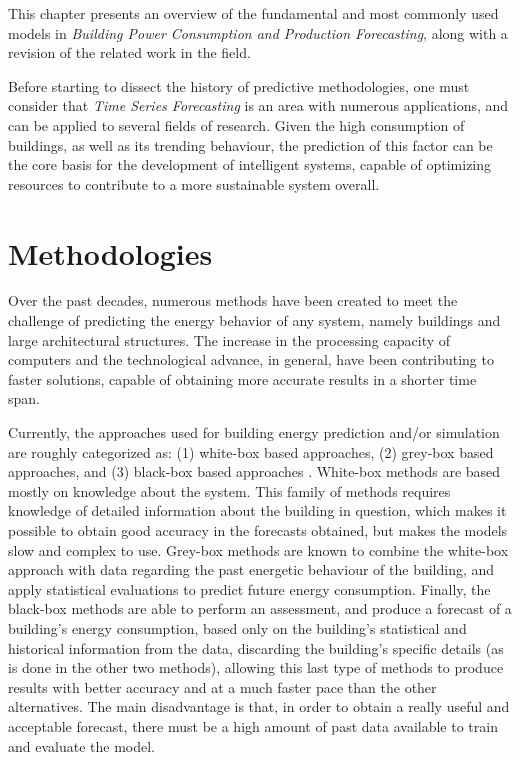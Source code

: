 \cleardoublepage
\label{chap:background}

This chapter presents an overview of the fundamental and most commonly used models in \textit{Building Power Consumption and Production Forecasting}, along with a revision of the related work in the field.

Before starting to dissect the history of predictive methodologies, one must consider that \textit{Time Series Forecasting} is an area with numerous applications, and can be applied to several fields of research. Given the high consumption of buildings, as well as its trending behaviour, the prediction of this factor can be the core basis for the development of intelligent systems, capable of optimizing resources to contribute to a more sustainable system overall.


\section{Methodologies\label{a}}

Over the past decades, numerous methods have been created to meet the challenge of predicting the energy behavior of any system, namely buildings and large architectural structures. The increase in the processing capacity of computers and the technological advance, in general, have been contributing to faster solutions, capable of obtaining more accurate results in a shorter time span.

Currently, the approaches used for building energy prediction and/or simulation are roughly categorized as: (1) white-box based approaches, (2) grey-box based approaches, and (3) black-box based approaches \cite{review2017}. White-box methods are based mostly on knowledge about the system. This family of methods requires knowledge of detailed information about the building in question, which makes it possible to obtain good accuracy in the forecasts obtained, but makes the models slow and complex to use. Grey-box methods are known to combine the white-box approach with data regarding the past energetic behaviour of the building, and apply statistical evaluations to predict future energy consumption. Finally, the black-box methods are able to perform an assessment, and produce a forecast of a building's energy consumption, based only on the building's statistical and historical information from the data, discarding the building's specific details (as is done in the other two methods), allowing this last type of methods to produce results with better accuracy and at a much faster pace than the other alternatives. The main disadvantage is that, in order to obtain a really useful and acceptable forecast, there must be a high amount of past data available to train and evaluate the model.

